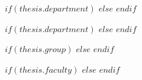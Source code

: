 \newcommand{\supervisorA}[1]{\def\supnameA{#1}}
\newcommand{\supervisorB}[1]{\def\supnameB{#1}}
\supervisorA{$thesis.supervisor.A$} %
\supervisorB{$thesis.supervisor.B$} %
\examiner{} %
{} %
\author{$author$} %
\addresses{} %

\subject{} %
\keywords{} %

$if(thesis.department)$
$else$\university{}
$endif$

$if(thesis.department)$
$else$\department{}
$endif$

$if(thesis.group)$
$else$\group{}
$endif$

$if(thesis.faculty)$
$else$
\faculty{}
$endif$


\setcounter{tocdepth}{$if(toc-depth)$$toc-depth$$else$3$endif$} %
